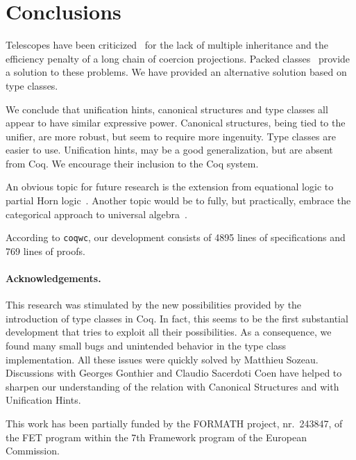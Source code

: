 \documentclass[a4paper,10pt,runningheads]{llncs}
\begin{document}
\section{Conclusions}
Telescopes have been criticized~\cite{Packed} for the lack of multiple inheritance and
the efficiency penalty of a long chain of coercion projections. Packed classes~\cite{Packed} provide
a solution to these problems. We have provided an alternative solution based on type classes. 

We conclude that unification hints, canonical structures and type classes all appear to have
similar expressive power. Canonical structures, being tied to the unifier, are more robust, but
seem to require more ingenuity. Type classes are easier to use. Unification hints, may be a
good generalization, but are absent from Coq. We encourage their inclusion to the
Coq system.

An obvious topic for future research is the extension from equational logic to partial Horn
logic~\cite{palmgren2007partial}. Another topic would be to fully, but practically, embrace the
categorical approach to universal algebra~\cite{pitts2001categorical}.

According to \lstinline|coqwc|, our development consists of 4895 lines of
specifications and 769 lines of proofs.


% 

\paragraph{Acknowledgements.}
This research was stimulated by the new possibilities provided by the introduction of type classes
in Coq. In fact, this seems to be the first substantial development that tries to exploit all their
possibilities. As a consequence, we found many small bugs and unintended behavior in the type
class implementation. All these issues were quickly solved by Matthieu Sozeau. Discussions with
Georges Gonthier and Claudio Sacerdoti Coen have helped to
sharpen our understanding of the relation with Canonical Structures and with Unification Hints.


This work has been partially funded by the FORMATH project, nr.\ 243847, of the FET program within the 7th Framework program of the European Commission.


\end{document}

